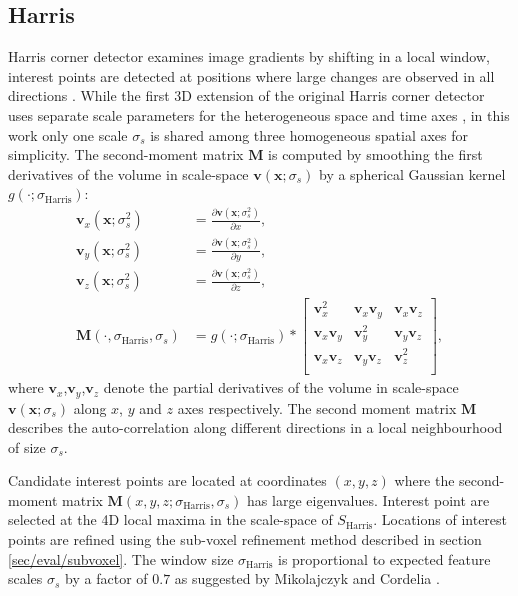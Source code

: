 \subsection{Harris}
Harris corner detector examines image gradients by shifting in a local window, interest points are detected at positions where large changes are observed in all directions \cite{Harris1988}. While the first 3D extension of the original Harris corner detector uses separate scale parameters for the heterogeneous space and time axes \cite{Laptev2005}, in this work only one scale $\sigma_s$ is shared among three homogeneous spatial axes for simplicity.  
The second-moment matrix $\mathbf{M}$ is computed by smoothing the first derivatives of the volume in scale-space $\mathbf{v}(\mathbf{x};\sigma_s)$ by a spherical Gaussian kernel $g(\cdot;\sigma_\textrm{Harris})$: 
\begin{equation}
	\begin{aligned}
		\mathbf{v}_x(\mathbf{x};\sigma^2_s) & = \displaystyle\frac{\partial \mathbf{v}(\mathbf{x};\sigma^2_s)}{\partial x}, \\
		\mathbf{v}_y(\mathbf{x};\sigma^2_s) & = \displaystyle\frac{\partial \mathbf{v}(\mathbf{x};\sigma^2_s)}{\partial y}, \\
		\mathbf{v}_z(\mathbf{x};\sigma^2_s) & = \displaystyle\frac{\partial \mathbf{v}(\mathbf{x};\sigma^2_s)}{\partial z}, \\ 
		\mathbf{M}(\cdot, \sigma_\textrm{Harris}, \sigma_s) & = g(\cdot;\sigma_\textrm{Harris}) \ast \left[
			\begin{array}{ccc}
				\mathbf{v}^2_x & \mathbf{v}_x\mathbf{v}_y & \mathbf{v}_x\mathbf{v}_z \\
				\mathbf{v}_x\mathbf{v}_y & \mathbf{v}_y^2 & \mathbf{v}_y\mathbf{v}_z \\
				\mathbf{v}_x\mathbf{v}_z & \mathbf{v}_y\mathbf{v}_z & \mathbf{v}^2_z \\
			\end{array}
		\right],
	\end{aligned}
	\label{eqn/eval/harris_2ndmoment}
\end{equation}
where $\mathbf{v}_x$,$\mathbf{v}_y$,$\mathbf{v}_z$ denote the partial derivatives of the volume in scale-space $\mathbf{v}(\mathbf{x};\sigma_s)$ along $x$, $y$ and $z$ axes respectively. The second moment matrix $\mathbf{M}$ describes the auto-correlation along different directions in a local neighbourhood of size $\sigma_s$. 

Candidate interest points are located at coordinates $(x,y,z)$ where the second-moment matrix $\mathbf{M}(x,y,z; \sigma_\textrm{Harris}, \sigma_s)$ has large eigenvalues. Interest point are selected at the 4D local maxima in the scale-space of $S_{\textrm{Harris}}$. Locations of interest points are refined using the sub-voxel refinement method described in section \ref{sec/eval/subvoxel}. The window size $\sigma_\textrm{Harris}$ is proportional to expected feature scales $\sigma_s$ by a factor of $0.7$ as suggested by Mikolajczyk and Cordelia \cite{Mikolajczyk2004}. 

